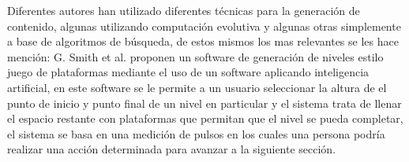 Diferentes autores han utilizado diferentes técnicas para la generación de
contenido, algunas utilizando computación evolutiva y algunas otras simplemente
a base de algoritmos de búsqueda, de estos mismos los mas relevantes se les hace
mención: G. Smith et al.\cite{Smith2009} proponen un software de generación de
niveles estilo juego de plataformas mediante el uso de un software aplicando
inteligencia artificial, en este software se le permite a un usuario seleccionar
la altura de el punto de inicio y punto final de un nivel en particular y el
sistema trata de llenar el espacio restante con plataformas que permitan que el
nivel se pueda completar, el sistema se basa en una medición de pulsos en los
cuales una persona podría realizar una acción determinada para avanzar a la
siguiente sección.


